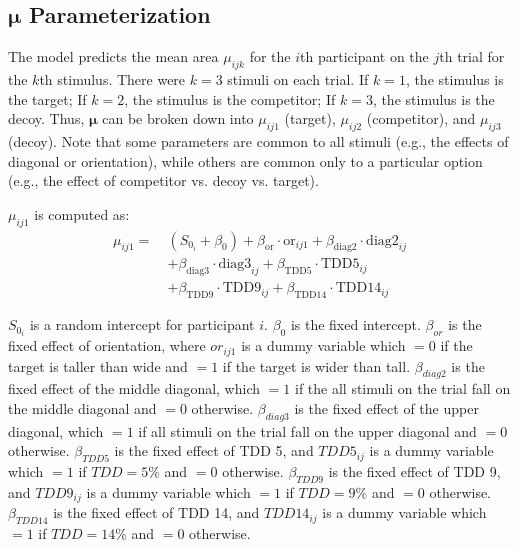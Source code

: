 \subsection{\texorpdfstring{$\boldsymbol{\mu}$}{mu} Parameterization}

The model predicts the mean area $\mu_{ijk}$ for the $i$th participant on the $j$th trial for the $k$th stimulus. There were $k=3$ stimuli on each trial. If $k=1$, the stimulus is the target; If $k=2$, the stimulus is the competitor; If $k=3$, the stimulus is the decoy. Thus, $\boldsymbol{\mu}$ can be broken down into $\mu_{ij1}$ (target), $\mu_{ij2}$ (competitor), and $\mu_{ij3}$ (decoy). Note that some parameters are common to all stimuli (e.g., the effects of diagonal or orientation), while others are common only to a particular option (e.g., the effect of competitor vs. decoy vs. target). 

$\mu_{ij1}$ is computed as:
\begin{equation}
    \begin{aligned}
    \mu_{ij1} =\ & (S_{0_i} + \beta_{0}) 
    + \beta_{\mathrm{or}} \cdot \mathrm{or}_{ij1} 
    + \beta_{\mathrm{diag2}} \cdot \mathrm{diag2}_{ij} \\
    & + \beta_{\mathrm{diag3}} \cdot \mathrm{diag3}_{ij} 
    + \beta_{\mathrm{TDD5}} \cdot \mathrm{TDD5}_{ij} \\
    & + \beta_{\mathrm{TDD9}} \cdot \mathrm{TDD9}_{ij} 
    + \beta_{\mathrm{TDD14}} \cdot \mathrm{TDD14}_{ij}
    \end{aligned}
    \label{circle_mu_eqn1}
\end{equation}

$S_{0_i}$ is a random intercept for participant $i$. $\beta_{0}$ is the fixed intercept. $\beta_{or}$ is the fixed effect of orientation, where $or_{ij1}$ is a dummy variable which $=0$ if the target is taller than wide and $=1$ if the target is wider than tall. $\beta_{diag2}$ is the fixed effect of the middle diagonal, which $=1$ if the all stimuli on the trial fall on the middle diagonal and $=0$ otherwise. $\beta_{diag3}$ is the fixed effect of the upper diagonal, which $=1$ if all stimuli on the trial fall on the upper diagonal and $=0$ otherwise. $\beta_{TDD5}$ is the fixed effect of TDD 5, and $TDD5_{ij}$ is a dummy variable which $=1$ if $TDD=5\%$ and $=0$ otherwise. $\beta_{TDD9}$ is the fixed effect of TDD 9, and $TDD9_{ij}$ is a dummy variable which $=1$ if $TDD=9\%$ and $=0$ otherwise. $\beta_{TDD14}$ is the fixed effect of TDD 14, and $TDD14_{ij}$ is a dummy variable which $=1$ if $TDD=14\%$ and $=0$ otherwise. 

